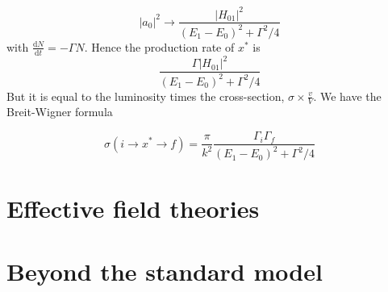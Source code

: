 \documentclass[a4paper]{book}
\theoremstyle{definition}
\theoremstyle{remark}
\begin{document}
\begin{equation}
    |a_0|^2 \rightarrow \frac{|H_{01}|^2}{(E_1-E_0)^2 + \Gamma^2/4}
\end{equation}
with $\frac{\text{d}N}{\text{d}t } = -\Gamma N$. Hence the production rate of $x^*$ is \begin{equation}
    \frac{\Gamma|H_{01}|^2}{(E_1-E_0)^2 + \Gamma^2/4}
\end{equation}
But it is equal to the luminosity times the cross-section, $\sigma \times \frac{v}{V}$. We have the Breit-Wigner formula

\begin{equation}
\sigma(i\rightarrow x^* \rightarrow f) = \frac{\pi}{k^2}\frac{\Gamma_i \Gamma_f}{(E_1 - E_0)^2 + \Gamma^2/4}    
\end{equation}



\chapter{Effective field theories}
\chapter{Beyond the standard model}
\end{document}
